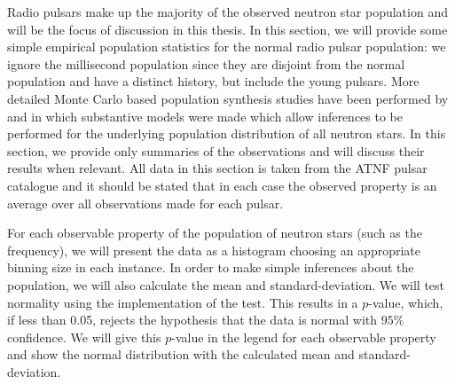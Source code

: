 Radio pulsars make up the majority of the observed neutron star population and
will be the focus of discussion in this thesis. In this section, we will
provide some simple empirical population statistics for the normal radio pulsar
population: we ignore the millisecond population since they are disjoint from
the normal population and have a distinct history, but include the young
pulsars. More detailed Monte Carlo based population synthesis studies have been
performed by \citet{faucher2006birth} and \citet{popov2010population} in which
substantive models were made which allow inferences to be performed for the
underlying population distribution of all neutron stars. In this section, we
provide only summaries of the observations and will discuss their results when
relevant.  All data in this section is taken from the ATNF pulsar catalogue
\citet{ATNF} and it should be stated that in each case the observed property is
an average over all observations made for each pulsar.

For each observable property of the population of neutron stars (such as the
frequency), we will present the data as a histogram choosing an appropriate
binning size in each instance. In order to make simple inferences about the
population, we will also calculate the mean and standard-deviation.
We will test normality using the \citet{Scipy} implementation of the
\citet{d1971omnibus} test. This results in a $p$-value, which, if less than
0.05, rejects the hypothesis that the data is normal with $95\%$ confidence. We
will give this $p$-value in the legend for each observable property and show
the normal distribution with the calculated mean and standard-deviation.


